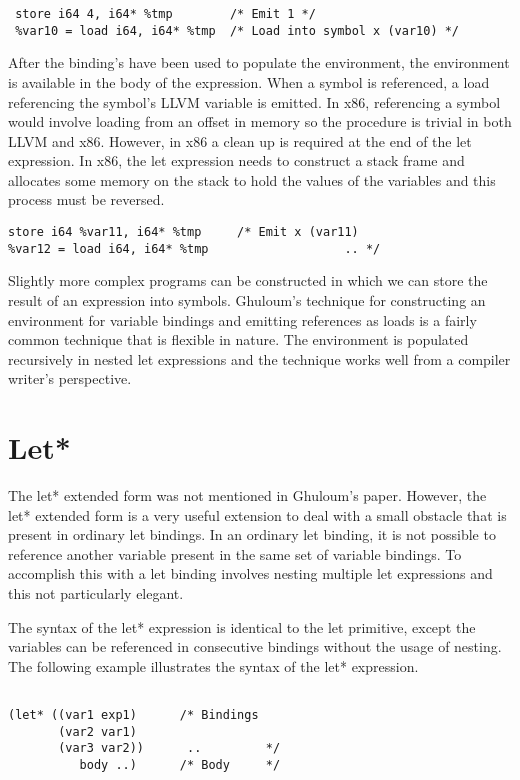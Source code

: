 \documentclass{article}
\begin{document}
\begin{verbatim}
 store i64 4, i64* %tmp        /* Emit 1 */
 %var10 = load i64, i64* %tmp  /* Load into symbol x (var10) */  
\end{verbatim}

 After the binding's have been used to populate the environment, the environment is available in the body of the expression.  When a symbol is referenced, a load referencing the symbol's LLVM variable is emitted. In x86, referencing a symbol would involve loading from an offset in memory so the procedure is trivial in both LLVM and x86. However, in x86 a clean up is required at the end of the let expression. In x86, the let expression needs to construct a stack frame and allocates some memory on the stack to hold the values of the variables and this process must be reversed. 
 
\begin{verbatim}
store i64 %var11, i64* %tmp     /* Emit x (var11)     
%var12 = load i64, i64* %tmp                   .. */
\end{verbatim}

Slightly more complex programs can be constructed in which we can store the result of an expression into symbols. Ghuloum's technique for constructing an environment for variable bindings and emitting references as loads is a fairly common technique that is flexible in nature. The environment is populated recursively in nested let expressions and the technique works well from a compiler writer's perspective.

\section{Let*}


The let* extended form was not mentioned in Ghuloum's paper. However, the let* extended form is a very useful extension to deal with a small obstacle that is present in ordinary let bindings. In an ordinary let binding, it is not possible to reference another variable present in the same set of variable bindings. To accomplish this with a let binding involves nesting multiple let expressions and this not particularly elegant.

The syntax of the let* expression is identical to the let primitive, except the variables can be referenced in consecutive bindings without the usage of nesting. The following example illustrates the syntax of the let* expression.

\begin{verbatim}

(let* ((var1 exp1)      /* Bindings
       (var2 var1)     
       (var3 var2))      ..         */
          body ..)      /* Body     */   

\end{verbatim}
\end{document}
